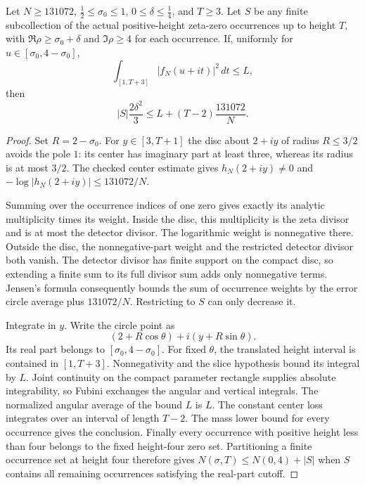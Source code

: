 \begin{lemma}
\label{density:actual-jensen-count}
\leanok
Let $N\geq131072$, $\tfrac12\leq\sigma_0\leq1$,
$0\leq\delta\leq\tfrac14$, and $T\geq3$.
Let $S$ be any finite subcollection of the actual positive-height zeta-zero
occurrences up to height $T$, with $\Re\rho\geq\sigma_0+\delta$
and $\Im\rho\geq4$ for each occurrence.
If, uniformly for $u\in[\sigma_0,4-\sigma_0]$,
\[
 \int_{[1,T+3]}|f_N(u+it)|^2\,dt\leq L,
\]
then
\[
 |S|\frac{2\delta^2}{3}
 \leq L+(T-2)\frac{131072}{N}.
\]
\end{lemma}
\begin{proof}
Set $R=2-\sigma_0$.  For $y\in[3,T+1]$ the disc about $2+iy$
of radius $R\leq3/2$ avoids the pole $1$: its center has imaginary
part at least three, whereas its radius is at most $3/2$.
The checked center estimate gives $h_N(2+iy)\ne0$ and
$-\log|h_N(2+iy)|\leq131072/N$.

Summing over the occurrence indices of one zero gives exactly its
analytic multiplicity times its weight.
Inside the disc, this multiplicity is the zeta divisor and is at most
the detector divisor.  The logarithmic weight is nonnegative there.
Outside the disc, the nonnegative-part weight and the restricted
detector divisor both vanish.  The detector divisor has finite support
on the compact disc, so extending a finite sum to its full divisor sum
adds only nonnegative terms.  Jensen's formula consequently bounds
the sum of occurrence weights by the error circle average plus
$131072/N$.  Restricting to $S$ can only decrease it.

Integrate in $y$.  Write the circle point as
\[
 (2+R\cos\theta)+i(y+R\sin\theta).
\]
Its real part belongs to $[\sigma_0,4-\sigma_0]$.
For fixed $\theta$, the translated height interval is contained in
$[1,T+3]$.  Nonnegativity and the slice hypothesis bound its integral
by $L$.  Joint continuity on the compact parameter rectangle supplies
absolute integrability, so Fubini exchanges the angular and vertical
integrals.  The normalized angular average of the bound $L$ is $L$.
The constant center loss integrates over an interval of length $T-2$.
The mass lower bound for every occurrence gives the conclusion.
Finally every occurrence with positive height less than four belongs
to the fixed height-four zero set.  Partitioning a finite occurrence
set at height four therefore gives
$N(\sigma,T)\leq N(0,4)+|S|$ when $S$ contains all remaining
occurrences satisfying the real-part cutoff.
\end{proof}

